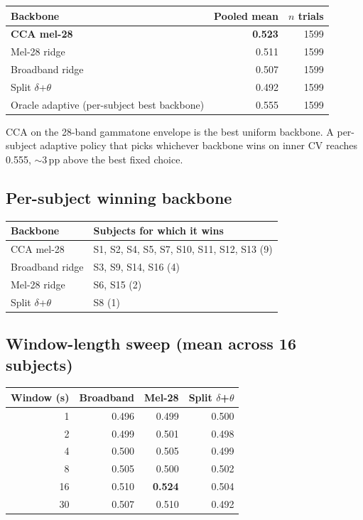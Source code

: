 \begin{table}[ht]
\centering
\begin{tabular}{lrr}
\toprule
Backbone & Pooled mean & $n$ trials \\
\midrule
\textbf{CCA mel-28}              & \textbf{0.523} & 1599 \\
Mel-28 ridge                     & 0.511 & 1599 \\
Broadband ridge                  & 0.507 & 1599 \\
Split $\delta$+$\theta$          & 0.492 & 1599 \\
\midrule
Oracle adaptive (per-subject best backbone) & 0.555 & 1599 \\
\bottomrule
\end{tabular}
\end{table}

CCA on the 28-band gammatone envelope is the best uniform backbone. A
per-subject adaptive policy that picks whichever backbone wins on inner CV
reaches 0.555, $\sim 3$\,pp above the best fixed choice.

\subsection{Per-subject winning backbone}

\begin{table}[ht]
\centering
\begin{tabular}{ll}
\toprule
Backbone & Subjects for which it wins \\
\midrule
CCA mel-28              & S1, S2, S4, S5, S7, S10, S11, S12, S13 (9) \\
Broadband ridge         & S3, S9, S14, S16 (4) \\
Mel-28 ridge            & S6, S15 (2) \\
Split $\delta$+$\theta$ & S8 (1) \\
\bottomrule
\end{tabular}
\end{table}

\subsection{Window-length sweep (mean across 16 subjects)}

\begin{table}[ht]
\centering
\begin{tabular}{rrrr}
\toprule
Window (s) & Broadband & Mel-28 & Split $\delta$+$\theta$ \\
\midrule
1          & 0.496     & 0.499  & 0.500 \\
2          & 0.499     & 0.501  & 0.498 \\
4          & 0.500     & 0.505  & 0.499 \\
8          & 0.505     & 0.500  & 0.502 \\
16         & 0.510     & \textbf{0.524} & 0.504 \\
30         & 0.507     & 0.510  & 0.492 \\
\bottomrule
\end{tabular}
\end{table}

